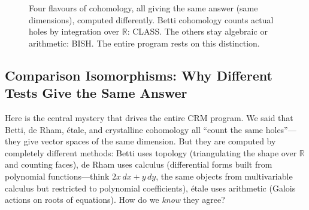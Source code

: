 \documentclass[11pt,twoside,openany]{report}
\theoremstyle{remark}
\newcommand{\BISH}{\textsf{BISH}}
\newcommand{\CLASS}{\textsf{CLASS}}
\begin{document}
\begin{figure}[htbp]
\centering
{}
\caption{Four flavours of cohomology, all giving the same answer (same dimensions), computed differently. Betti cohomology counts actual holes by integration over $\mathbb{R}$: \CLASS. The others stay algebraic or arithmetic: \BISH. The entire program rests on this distinction.}
\label{fig:cohomology-flavours}
\end{figure}

\subsection*{Comparison Isomorphisms: Why Different Tests Give the Same Answer}

Here is the central mystery that drives the entire CRM program. We said that Betti, de Rham, \'etale, and crystalline cohomology all ``count the same holes''---they give vector spaces of the same dimension. But they are computed by completely different methods: Betti uses topology (triangulating the shape over $\mathbb{R}$ and counting faces), de Rham uses calculus (differential forms built from polynomial functions---think $2x\, dx + y\, dy$, the same objects from multivariable calculus but restricted to polynomial coefficients), \'etale uses arithmetic (Galois actions on roots of equations). How do we \emph{know} they agree?
\end{document}
